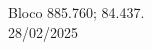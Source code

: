 \documentclass[
    12pt,                %
    openright,           %
    oneside,             %
    a4paper,             %
    english,             %
    spanish,             %
    brazil               %
]{ufscar}
\begin{document}
\cleardoublepage %


\vspace*{\fill} %
\begin{flushright}
    
        \centering %
        Bloco 885.760; 84.437. \\
        28/02/2025
\end{flushright}


\cleardoublepage %


\end{document}
